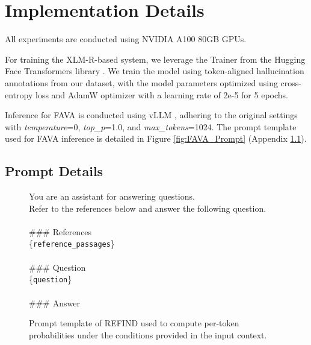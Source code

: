 \clearpage
\onecolumn

\section{Implementation Details}
\label{sec:appendix_implementation_details}
All experiments are conducted using NVIDIA A100 80GB GPUs. 

For training the XLM-R-based \cite{conneau-etal-2020-unsupervised} system, we leverage the Trainer from the Hugging Face Transformers library \cite{wolf-etal-2020-transformers}. 
We train the model using token-aligned hallucination annotations from our dataset, with the model parameters optimized using cross-entropy loss and AdamW optimizer with a learning rate of 2e-5 for 5 epochs.

Inference for FAVA \cite{mishra2024finegrained-FAVA} is conducted using vLLM \cite{Kwon2023vLLM}, adhering to the original settings with \textit{temperature}=0, \textit{top\_p}=1.0, and \textit{max\_tokens}=1024. The prompt template used for FAVA inference is detailed in Figure \ref{fig:FAVA_Prompt} (Appendix \ref{sec:appendix_prompt_details}).

\subsection{Prompt Details}
\label{sec:appendix_prompt_details}

\begin{figure}[htb!]
    \centering
    \begin{tcolorbox}[colback=gray!10, colframe=black, title=Prompt template for REFIND]
        You are an assistant for answering questions.\\
        Refer to the references below and answer the following question.
        \\ \\
        \#\#\# References\\
        \{\texttt{reference\_passages}\} \\ \\
        \#\#\# Question\\
        \{\texttt{question}\} \\ \\
        \#\#\# Answer
    \end{tcolorbox}
    \vspace{-3mm}
    
    \caption{Prompt template of REFIND used to compute per-token probabilities under the conditions provided in the input context.}
    \label{fig:REFIND_Prompt}
\end{figure}

